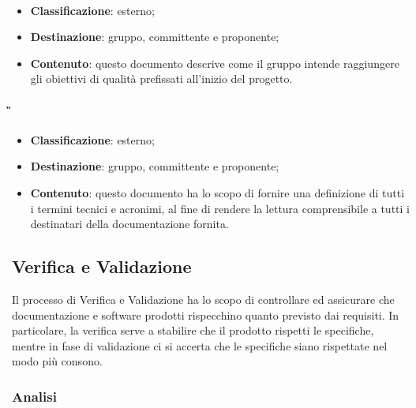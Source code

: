 			\paragraph{\PdQ}
			\begin{itemize}
				\item \textbf{Classificazione}: esterno;
				\item \textbf{Destinazione}: gruppo, committente e proponente;
				\item \textbf{Contenuto}: questo documento descrive come il gruppo \textit{\gruppo} intende raggiungere gli obiettivi di qualità prefissati all'inizio del progetto.
			\end{itemize}

			\paragraph{\G}
			\begin{itemize}
				\item \textbf{Classificazione}: esterno;
				\item \textbf{Destinazione}: gruppo, committente e proponente;
				\item \textbf{Contenuto}: questo documento ha lo scopo di fornire una definizione di tutti i termini tecnici e acronimi, al fine di rendere la lettura comprensibile a tutti i destinatari della documentazione fornita.
			\end{itemize}

	\subsection{Verifica e Validazione}
	Il processo di Verifica e Validazione ha lo scopo di controllare ed assicurare che documentazione e software prodotti rispecchino quanto previsto dai requisiti. In particolare, la verifica serve a stabilire che il prodotto rispetti le specifiche, mentre in fase di validazione ci si accerta che le specifiche siano rispettate nel modo più consono.

		\subsubsection{Analisi}

